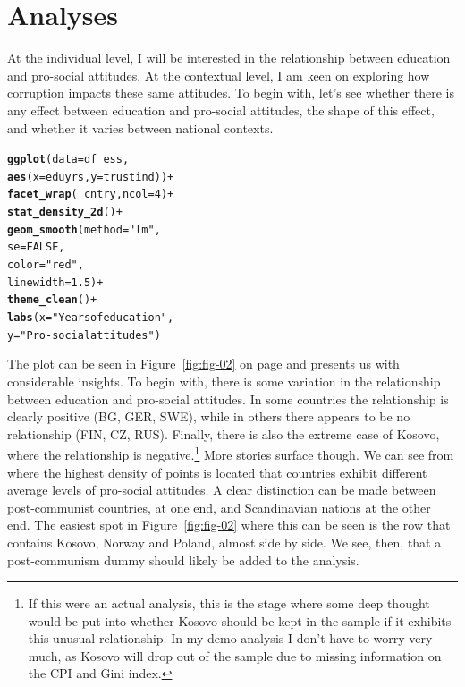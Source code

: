 \documentclass[12pt,english]{article}\usepackage[]{graphicx}\usepackage[usenames, dvipsnames]{xcolor}
\makeatletter
\newcommand{\hlnum}[1]{\textcolor[rgb]{0.686,0.059,0.569}{#1}}%
\newcommand{\hlstr}[1]{\textcolor[rgb]{0.192,0.494,0.8}{#1}}%
\newcommand{\hlopt}[1]{\textcolor[rgb]{0,0,0}{#1}}%
\newcommand{\hlstd}[1]{\textcolor[rgb]{0.345,0.345,0.345}{#1}}%
\newcommand{\hlkwc}[1]{\textcolor[rgb]{0.333,0.667,0.333}{#1}}%
\newcommand{\hlkwd}[1]{\textcolor[rgb]{0.737,0.353,0.396}{\textbf{#1}}}%
\newenvironment{kframe}{%
 \def\at@end@of@kframe{}%
 \ifinner\ifhmode%
  \def\at@end@of@kframe{\end{minipage}}%
  \begin{minipage}{\columnwidth}%
 \fi\fi%
 \def\FrameCommand##1{\hskip\@totalleftmargin \hskip-\fboxsep
 \colorbox{shadecolor}{##1}\hskip-\fboxsep
     \hskip-\linewidth \hskip-\@totalleftmargin \hskip\columnwidth}%
 \MakeFramed {\advance\hsize-\width
   \@totalleftmargin\z@ \linewidth\hsize
   \@setminipage}}%
 {\par\unskip\endMakeFramed%
 \at@end@of@kframe}
\newenvironment{knitrout}{}{} %
\makeatother
\begin{document}
\afterpage{\clearpage}

\section{Analyses}
At the individual level, I will be interested in the relationship between education and pro-social attitudes. At the contextual level, I am keen on exploring how corruption impacts these same attitudes. To begin with, let's see whether there is any effect between education and pro-social attitudes, the shape of this effect, and whether it varies between national contexts.

\begin{knitrout}
\color{fgcolor}\begin{kframe}
\begin{alltt}
\hlkwd{ggplot}\hlstd{(}\hlkwc{data} \hlstd{= df_ess,}
       \hlkwd{aes}\hlstd{(}\hlkwc{x} \hlstd{= eduyrs,} \hlkwc{y} \hlstd{= trustind))} \hlopt{+}
  \hlkwd{facet_wrap}\hlstd{(}\hlopt{~} \hlstd{cntry,} \hlkwc{ncol} \hlstd{=} \hlnum{4}\hlstd{)} \hlopt{+}
  \hlkwd{stat_density_2d}\hlstd{()} \hlopt{+}
  \hlkwd{geom_smooth}\hlstd{(}\hlkwc{method} \hlstd{=} \hlstr{"lm"}\hlstd{,}
              \hlkwc{se}\hlstd{=}\hlnum{FALSE}\hlstd{,}
              \hlkwc{color} \hlstd{=} \hlstr{"red"}\hlstd{,}
              \hlkwc{linewidth} \hlstd{=} \hlnum{1.5}\hlstd{)} \hlopt{+}
  \hlkwd{theme_clean}\hlstd{()} \hlopt{+}
  \hlkwd{labs}\hlstd{(}\hlkwc{x} \hlstd{=} \hlstr{"Years of education"}\hlstd{,}
       \hlkwc{y} \hlstd{=} \hlstr{"Pro-social attitudes"}\hlstd{)}
\end{alltt}
\end{kframe}
\end{knitrout}



The plot can be seen in Figure~\ref{fig:fig-02} on page \pageref{fig:fig-02} and presents us with considerable insights. To begin with, there is some variation in the relationship between education and pro-social attitudes. In some countries the relationship is clearly positive (BG, GER, SWE), while in others there appears to be no relationship (FIN, CZ, RUS). Finally, there is also the extreme case of Kosovo, where the relationship is negative.\footnote{If this were an actual analysis, this is the stage where some deep thought would be put into whether Kosovo should be kept in the sample if it exhibits this unusual relationship. In my demo analysis I don't have to worry very much, as Kosovo will drop out of the sample due to missing information on the CPI and Gini index.} More stories surface though. We can see from where the highest density of points is located that countries exhibit different average levels of pro-social attitudes. A clear distinction can be made between post-communist countries, at one end, and Scandinavian nations at the other end. The easiest spot in Figure~\ref{fig:fig-02} where this can be seen is the row that contains Kosovo, Norway and Poland, almost side by side. We see, then, that a post-communism dummy should likely be added to the analysis.
\end{document}
